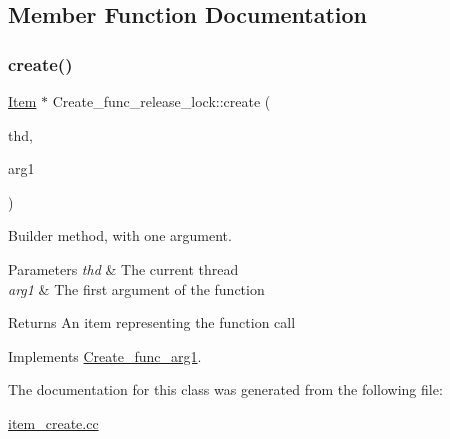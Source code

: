 \subsection{Member Function Documentation}
\mbox{\label{classCreate__func__release__lock_a09fa05fcc06a1135357bca647076bde0}} 
\subsubsection{\texorpdfstring{create()}{create()}}
{\footnotesize\ttfamily \mbox{\hyperlink{classItem}{Item}} $\ast$ Create\+\_\+func\+\_\+release\+\_\+lock\+::create (\begin{DoxyParamCaption}\item[{T\+HD $\ast$}]{thd,  }\item[{\mbox{\hyperlink{classItem}{Item}} $\ast$}]{arg1 }\end{DoxyParamCaption})\hspace{0.3cm}{\ttfamily [virtual]}}

Builder method, with one argument. 
\begin{DoxyParams}{Parameters}
{\em thd} & The current thread \\
\hline
{\em arg1} & The first argument of the function \\
\hline
\end{DoxyParams}
\begin{DoxyReturn}{Returns}
An item representing the function call 
\end{DoxyReturn}


Implements \mbox{\hyperlink{classCreate__func__arg1_a3e9a98f755cd82c3e762e334c955a8c9}{Create\+\_\+func\+\_\+arg1}}.



The documentation for this class was generated from the following file\+:\begin{DoxyCompactItemize}
\item 
\mbox{\hyperlink{item__create_8cc}{item\+\_\+create.\+cc}}\end{DoxyCompactItemize}
